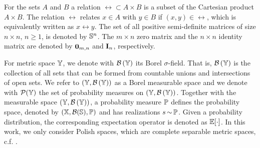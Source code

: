 \documentclass{ifacconf}
\begin{document}
For the sets $A$ and $B$ a relation $\rel\subset A\times B$ is a subset of the Cartesian product $A\times B$. The relation $\rel$ relates $x\in A$ with $y\in B$ if $(x,y)\in\rel$, which is equivalently written as $x\rel y$.
%    
%   
%    
%    
    The set of all positive semi-definite matrices of size
    $n \times n$, $n \geq 1$, is denoted by $\S^n$.    The $m \times n$ zero matrix and the $n \times n$ identity matrix are denoted by $\BF{0}_{m, n}$ and $\BF{I}_n$, respectively.
   
For metric space $\Y$, we denote with  $\borel{\Y}$ its Borel $\sigma$-field. That is,  $\borel{\Y}$ is the  
collection of all sets that can be formed from countable unions and intersections of open sets.
We refer to  $(\Y,\borel{\Y})$ as a Borel measurable space and we denote with $\mathcal P(\Y)$ the set of probability measures on $(\Y,\borel{\Y})$.
Together with the measurable space $(\Y,\borel{\Y})$,  a probability measure $\po$ defines the probability space, denoted by $(\X,\mathcal{B}(\mathbb S),\po)$ and has realizations  $s{\,\sim\,}\po$.     Given a probability distribution, the corresponding expectation operator is denoted as  $\BB{E}[\cdot]$.
In this work,  we only consider Polish spaces, which are complete separable metric spaces, c.f. \cite{bogachev2007measure}. 
\end{document}
